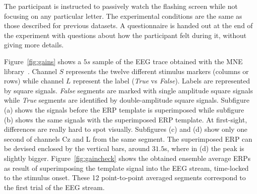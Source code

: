 The participant is instructed to passively watch the flashing screen while not focusing on any particular letter.  The experimental conditions are the same as those described for previous datasets.  A questionnaire is handed out at the end of the experiment with questions about how the participant felt during it, without giving more details.  


Figure~\ref{fig:gains} shows a $5s$ sample of the EEG trace obtained with the MNE library~\cite{Gramfort2013}.  Channel $S$ represents the twelve different stimulus markers (columns or rows) while channel $L$ represent the label (\textit{True} vs \textit{False}).  Labels are represented by square signals.  \textit{False} segments are marked with single amplitude square signals while \textit{True} segments are identified by double-amplitude square signals.  Subfigure (a) shows the signals before the ERP template is superimposed while subfigure (b) shows the same signals with the superimposed ERP template.  At first-sight, differences are really hard to spot visually.  Subfigures (c) and (d) show only one second of channels Cz and L from the same segment.  The superimposed ERP can be devised enclosed by the vertical bars, around $31.5$s, where in (d) the peak is slightly bigger.  Figure~\ref{fig:gaincheck} shows the obtained ensemble average ERPs as result of superimposing the template signal into the EEG stream, time-locked to the stimulus onset.   These 12 point-to-point averaged segments correspond to the first trial of the EEG stream.


